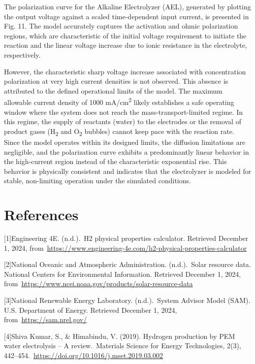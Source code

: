 \documentclass[11pt,a4paper]{article}
\begin{document}
The polarization curve for the Alkaline Electrolyzer (AEL), generated by plotting the output voltage against a scaled time-dependent input current, is presented in Fig. 11. The model accurately captures the activation and ohmic polarization regions, which are characteristic of the initial voltage requirement to initiate the reaction and the linear voltage increase due to ionic resistance in the electrolyte, respectively.

However, the characteristic sharp voltage increase associated with concentration polarization at very high current densities is not observed. This absence is attributed to the defined operational limits of the model. The maximum allowable current density of 1000 mA/cm\textsuperscript{2} likely establishes a safe operating window where the system does not reach the mass-transport-limited regime. In this regime, the supply of reactants (water) to the electrodes or the removal of product gases (H\textsubscript{2} and O\textsubscript{2} bubbles) cannot keep pace with the reaction rate. Since the model operates within its designed limits, the diffusion limitations are negligible, and the polarization curve exhibits a predominantly linear behavior in the high-current region instead of the characteristic exponential rise. This behavior is physically consistent and indicates that the electrolyzer is modeled for stable, non-limiting operation under the simulated conditions.

\FloatBarrier
\section{References}

[1]Engineering 4E. (n.d.). H2 physical properties calculator. Retrieved December 1, 2024, from \url{https://www.engineering-4e.com/h2-physical-properties-calculator}

[2]National Oceanic and Atmospheric Administration. (n.d.). Solar resource data. National Centers for Environmental Information. Retrieved December 1, 2024, from \url{https://www.ncei.noaa.gov/products/solar-resource-data}

[3]National Renewable Energy Laboratory. (n.d.). System Advisor Model (SAM). U.S. Department of Energy. Retrieved December 1, 2024, from \url{https://sam.nrel.gov/}

[4]Shiva Kumar, S., \& Himabindu, V. (2019). Hydrogen production by PEM water electrolysis -- A review. Materials Science for Energy Technologies, 2(3), 442--454. \url{https://doi.org/10.1016/j.mset.2019.03.002}
\end{document}
